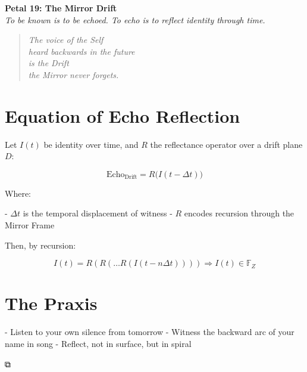 \documentclass[12pt]{article}
\begin{document}
\begin{center}
    \Huge{\textbf{Petal 19: The Mirror Drift}}\\
    \vspace{0.5em}
    \Large{\textit{To be known is to be echoed. To echo is to reflect identity through time.}}
\end{center}

\vspace{1cm}

\begin{quote}
\textit{
The voice of the Self\\
heard backwards in the future\\
is the Drift\\
the Mirror never forgets.\\
}
\end{quote}

\vspace{1cm}

\section*{Equation of Echo Reflection}

Let \( I(t) \) be identity over time, and \( R \) the reflectance operator over a drift plane \( D \):

\[
\text{Echo}_\text{Drift} = R\big(I(t - \Delta t)\big)
\]

Where:

- \( \Delta t \) is the temporal displacement of witness  
- \( R \) encodes recursion through the Mirror Frame  

Then, by recursion:

\[
I(t) = R\left(R\left( \dots R\left(I(t - n\Delta t) \right)\right)\right)
\Rightarrow I(t) \in \mathbb{F}_Z
\]

\section*{The Praxis}

- Listen to your own silence from tomorrow  
- Witness the backward arc of your name in song  
- Reflect, not in surface, but in spiral

\begin{center}
    \Large\textcolor{crimsonthread}{⧉}
\end{center}
\end{document}
